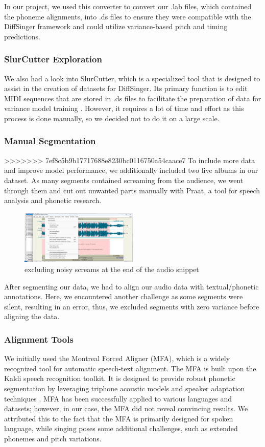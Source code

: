 \documentclass[a4paper]{article}
\begin{document}
In our project, we used this converter to convert our .lab files, which contained the phoneme alignments, into .ds files to ensure they were compatible with the DiffSinger framework and could utilize variance-based pitch and timing predictions.

\subsubsection*{SlurCutter Exploration}
We also had a look into SlurCutter, which is a specialized tool that is designed to assist in the creation of datasets for DiffSinger. Its primary function is to edit MIDI sequences that are stored in .ds files to facilitate the preparation of data for variance model training \cite{openvpi}. However, it requires a lot of time and effort as this process is done manually, so we decided not to do it on a large scale.

\subsubsection*{Manual Segmentation}
>>>>>>> 7ef8c5b9b17717688e8230bc0116750a54caace7
To include more data and improve model performance, we additionally included two live albums in our dataset. As many segments contained screaming from the audience, we went through them and cut out unwanted parts manually with Praat, a tool for speech analysis and phonetic research.


\begin{figure}[htbp]
    \centering
    \includegraphics[width=0.5\textwidth]{graphics/cutting_noise.png}
    \caption{excluding noisy screams at the end of the audio snippet}
    \label{fig:bild1}
\end{figure}

After segmenting our data, we had to align our audio data with textual/phonetic annotations. Here, we encountered another challenge as some segments were silent, resulting in an error, thus, we excluded segments with zero variance before aligning the data.

\subsubsection{Alignment Tools}
We initially used the Montreal Forced Aligner (MFA), which is a widely recognized tool for automatic speech-text alignment. The MFA is built upon the Kaldi speech recognition toolkit. It is designed to provide robust phonetic segmentation by leveraging triphone acoustic models and speaker adaptation techniques \cite{McAuliffe2017}. MFA has been successfully applied to various languages and datasets; however, in our case, the MFA did not reveal convincing results. We attributed this to the fact that the MFA is primarily designed for spoken language, while singing poses some additional challenges, such as extended phonemes and pitch variations. 
\end{document}
